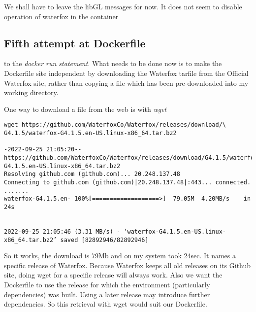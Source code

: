\documentclass[a4paper]{article}  %
\begin{document}
We shall have to leave the libGL messages for now. It does not seem to disable operation of waterfox in the container

\subsection{Fifth attempt at Dockerfile}
to the {\em docker run statement}. 
What needs to be done now is to make the Dockerfile site independent by downloading the Waterfox tarfile from the Official Waterfox site, rather than copying a file which has been pre-downloaded into my working directory. 

One way to download a file from the web is with {\em wget}
\begin{tcolorbox}
\begin{verbatim}
wget https://github.com/WaterfoxCo/Waterfox/releases/download/\
G4.1.5/waterfox-G4.1.5.en-US.linux-x86_64.tar.bz2

-2022-09-25 21:05:20--  https://github.com/WaterfoxCo/Waterfox/releases/download/G4.1.5/waterfox-G4.1.5.en-US.linux-x86_64.tar.bz2
Resolving github.com (github.com)... 20.248.137.48
Connecting to github.com (github.com)|20.248.137.48|:443... connected.
.......
waterfox-G4.1.5.en- 100%[===================>]  79.05M  4.20MB/s    in 24s     


2022-09-25 21:05:46 (3.31 MB/s) - ‘waterfox-G4.1.5.en-US.linux-x86_64.tar.bz2’ saved [82892946/82892946]
\end{verbatim}
\end{tcolorbox}
 So it works, the download is 79Mb and on my system took 24sec.  It names a specific release of Waterfox. Because Waterfox keeps all old releases on its Github site, doing wget for a specific release will always work. Also we want the Dockerfile to use the release for which the environment (particularly dependencies) was built. Using a later release may introduce further dependencies. So this retrieval with wget would suit our Dockerfile.
\end{document}
